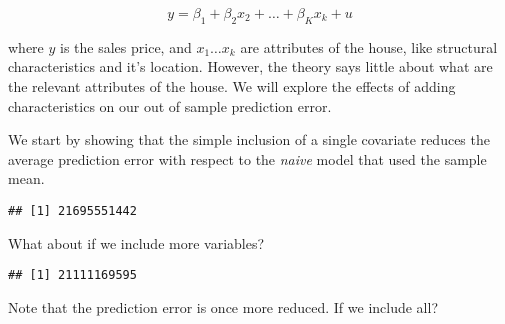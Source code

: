 \[
y=\beta_1+\beta_2 x_2 + \dots + \beta_K x_k +u
\]

\noindent where \(y\) is the sales price, and \(x_1 \dots x_k\) are attributes of the house, like structural characteristics and it's
location. However, the theory says little about what are the relevant
attributes of the house. We will explore the effects of
adding characteristics on our out of sample prediction error.

We start by showing that the simple inclusion of a single covariate
reduces the average prediction error with respect to the \textit{naive} model that used the sample mean.

\begin{Shaded}
\begin{Highlighting}[]
\OperatorTok{~}
\OperatorTok{$}
\OperatorTok{-}\OperatorTok{^}\NormalTok{))}
\end{Highlighting}
\end{Shaded}

\begin{verbatim}
## [1] 21695551442
\end{verbatim}

What about if we include more variables?

\begin{Shaded}
\begin{Highlighting}[]
\OperatorTok{~}\OperatorTok{+}\OperatorTok{+}\OperatorTok{+}\OperatorTok{+}
\OperatorTok{$}
\OperatorTok{-}\OperatorTok{^}\NormalTok{))}
\end{Highlighting}
\end{Shaded}

\begin{verbatim}
## [1] 21111169595
\end{verbatim}

Note that the prediction error is once more reduced. If we include all?

